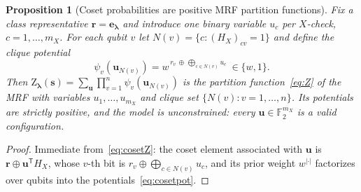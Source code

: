 \documentclass[10pt,a4paper]{amsart}
\newtheorem{proposition}{Proposition}
\newcommand{\F}{\mathbb{F}}
\newcommand{\Z}{\mathrm{Z}}
\newcommand{\ve}{\boldsymbol{e}}
\newcommand{\vlam}{\boldsymbol{\lambda}}
\newcommand{\vr}{\boldsymbol{r}}
\newcommand{\vs}{\boldsymbol{s}}
\newcommand{\vu}{\boldsymbol{u}}
\begin{document}
\begin{proposition}[Coset probabilities are positive MRF partition functions]
\label{prop:cosetmrf}
Fix a class representative $\vr=\ve_{\vlam}$ and introduce one binary variable
$u_c$ per $X$-check, $c=1,\dots,m_X$. For each qubit $v$ let
$N(v)=\{c: (H_X)_{cv}=1\}$ and define the clique potential
\begin{equation}
\psi_v(\vu_{N(v)})
 = w^{\,r_v\,\oplus\,\bigoplus_{c\in N(v)}u_c}\ \in\{w,1\}.
\label{eq:cosetpot}
\end{equation}
Then $\Z_{\vlam}(\vs)=\sum_{\vu}\prod_{v=1}^{n}\psi_v(\vu_{N(v)})$ is the
partition function~\eqref{eq:Z} of the MRF with variables
$u_1,\dots,u_{m_X}$ and clique set $\{N(v):v=1,\dots,n\}$. Its potentials
are strictly positive, and the model is \emph{unconstrained}: every
$\vu\in\F_2^{m_X}$ is a valid configuration.
\end{proposition}

\begin{proof}
Immediate from~\eqref{eq:cosetZ}: the coset element associated with $\vu$ is
$\vr\oplus\vu^{\mathsf{T}}H_X$, whose $v$-th bit is
$r_v\oplus\bigoplus_{c\in N(v)}u_c$, and its prior weight
$w^{|\cdot|}$ factorizes over qubits into the potentials~\eqref{eq:cosetpot}.
\end{proof}
\end{document}
